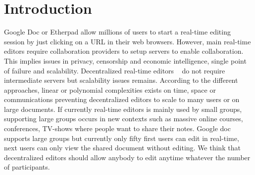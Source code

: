 
\section{Introduction}



Google Doc or Etherpad allow millions of users to start a real-time
editing session by just clicking on a URL in their web
browsers. However, main real-time editors require collaboration
providers to setup servers to enable
collaboration. This implies issues in privacy, censorship and economic
intelligence, single point of failure and
scalability. 
Decentralized real-time editors ~\cite{oster2006data,
  sun1998operational, sun2009contextbased} do not require intermediate
servers but scalability issues remains. According to the different
approaches, linear or polynomial complexities exists on time, space or
communications preventing decentralized editors to scale to many
users or on large documents. If currently real-time editors is mainly
used by small groups, supporting large groups occurs in new contexts
such as massive online courses, conferences, TV-shows where
people want to share their notes. Google doc supports large groups but
currently only fifty first users can edit in real-time, next users can
only view the shared document without editing. We think that
decentralized editors should allow anybody to edit anytime
whatever the number of participants.


